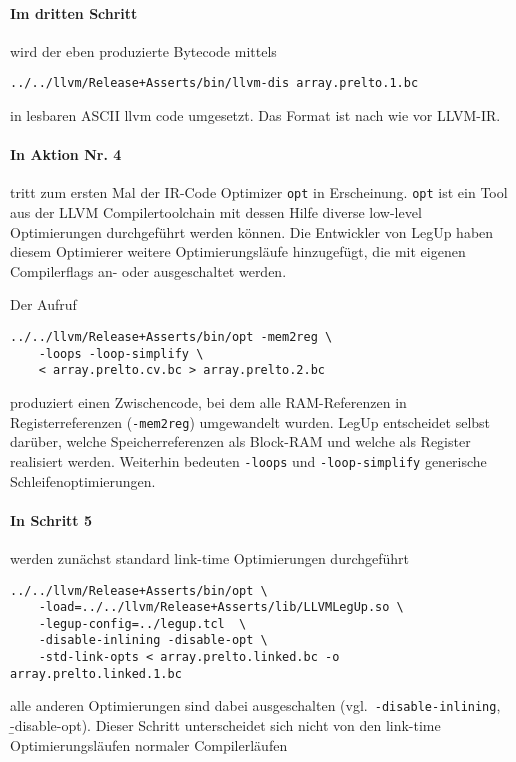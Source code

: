 \documentclass[oneside,a4paper]{article}
\def\B#1{\lstinline[style=bash]{#1}}
\begin{document}
\paragraph{Im dritten Schritt} wird der eben produzierte Bytecode mittels
\begin{lstlisting}[style=bash]
../../llvm/Release+Asserts/bin/llvm-dis array.prelto.1.bc
\end{lstlisting}

in lesbaren ASCII llvm code umgesetzt. Das Format ist nach wie vor LLVM-IR.

\paragraph{In Aktion Nr. 4} tritt zum ersten Mal der
IR-Code Optimizer \B{opt} in Erscheinung. \B{opt} ist ein Tool aus der LLVM
Compilertoolchain mit dessen Hilfe diverse low-level Optimierungen durchgeführt
werden können. Die Entwickler von LegUp haben diesem Optimierer
weitere Optimierungsläufe hinzugefügt, die mit eigenen Compilerflags
an- oder ausgeschaltet werden.

Der Aufruf
\begin{lstlisting}[style=bash]
../../llvm/Release+Asserts/bin/opt -mem2reg \
    -loops -loop-simplify \
    < array.prelto.cv.bc > array.prelto.2.bc
\end{lstlisting}
produziert einen Zwischencode, bei dem alle RAM-Referenzen in
Registerreferenzen (\B{-mem2reg}) umgewandelt wurden. LegUp
entscheidet
selbst darüber, welche Speicherreferenzen als Block-RAM und welche
als Register realisiert werden. Weiterhin bedeuten
\B{-loops} und \B{-loop-simplify} generische Schleifenoptimierungen.

\paragraph{In Schritt 5} werden zunächst standard link-time Optimierungen durchgeführt
\begin{lstlisting}[style=bash]
../../llvm/Release+Asserts/bin/opt \
    -load=../../llvm/Release+Asserts/lib/LLVMLegUp.so \
    -legup-config=../legup.tcl  \
    -disable-inlining -disable-opt \
    -std-link-opts < array.prelto.linked.bc -o array.prelto.linked.1.bc
\end{lstlisting}
alle anderen Optimierungen sind dabei ausgeschalten (vgl.\ \B{-disable-inlining}, \b{-disable-opt}).
Dieser
Schritt unterscheidet sich nicht von
den link-time Optimierungsläufen normaler Compilerläufen
\end{document}

